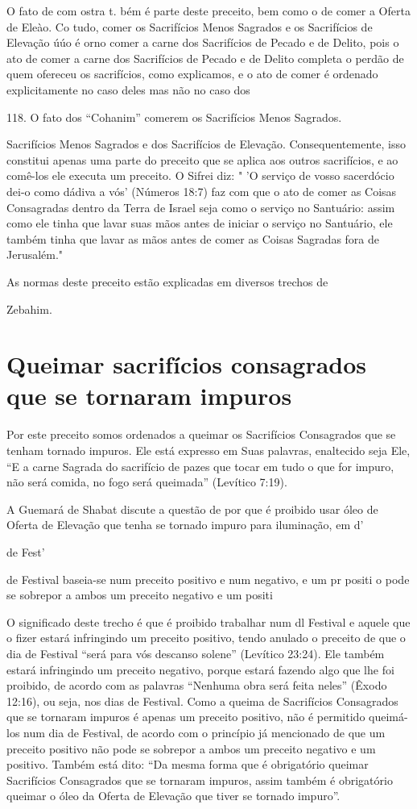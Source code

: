 O fato de com ostra t. bém é parte deste preceito, bem como o de comer a
Oferta de Eleào. Co tudo, comer os Sacrifícios Menos Sagrados e os
Sacrifícios de Elevação úúo é orno comer a carne dos Sacrifícios de
Peca­do e de Delito, pois o ato de comer a carne dos Sacrifícios de
Pecado e de Deli­to completa o perdão de quem ofereceu os sacrifícios,
como explicamos, e o ato de comer é ordenado explicitamente no caso
deles mas não no caso dos

118. O fato dos ``Cohanim'' comerem os Sacrifícios Menos Sagrados.

Sacrifícios Menos Sagrados e dos Sacrifícios de Elevação.
Consequentemente, isso constitui apenas uma parte do preceito que se
aplica aos outros sacrifícios, e ao comê-los ele executa um preceito. O
Sifrei diz: " 'O serviço de vosso sa­cerdócio dei-o como dádiva a vós'
(Números 18:7) faz com que o ato de comer as Coisas Consagradas dentro
da Terra de Israel seja como o serviço no Santuá­rio: assim como ele
tinha que lavar suas mãos antes de iniciar o serviço no San­tuário, ele
também tinha que lavar as mãos antes de comer as Coisas Sagradas fora de
Jerusalém."


As normas deste preceito estão explicadas em diversos trechos de


Zebahim.

\section{Queimar sacrifícios consagrados que se tornaram impuros}

Por este preceito somos ordenados a queimar os Sacrifícios Consa­grados
que se tenham tornado impuros. Ele está expresso em Suas palavras,
enaltecido seja Ele, ``E a carne Sagrada do sacrifício de pazes que tocar
em tudo o que for impuro, não será comida, no fogo será queimada''
(Levítico 7:19).

A Guemará de Shabat discute a questão de por que é proibido usar óleo de
Oferta de Elevação que tenha se tornado impuro para iluminação, em d'


de Fest'


de Festival baseia-se num preceito positivo e num negativo, e um pr
positi o pode se sobrepor a ambos um preceito negativo e um positi

O significado deste trecho é que é proibido trabalhar num dl Festival e
aquele que o fizer estará infringindo um preceito positivo, tendo
anu­lado o preceito de que o dia de Festival ``será para vós descanso
solene'' (Leví­tico 23:24). Ele também estará infringindo um preceito
negativo, porque estará fazendo algo que lhe foi proibido, de acordo com
as palavras ``Nenhuma obra será feita neles'' (Êxodo 12:16), ou seja, nos
dias de Festival. Como a queima de Sacrifícios Consagrados que se
tornaram impuros é apenas um preceito po­sitivo, não é permitido
queimá-los num dia de Festival, de acordo com o prin­cípio já mencionado
de que um preceito positivo não pode se sobrepor a am­bos um preceito
negativo e um positivo. Também está dito: ``Da mesma forma que é
obrigatório queimar Sacrifícios Consagrados que se tornaram impuros,
assim também é obrigatório queimar o óleo da Oferta de Elevação que
tiver se tornado impuro''.

